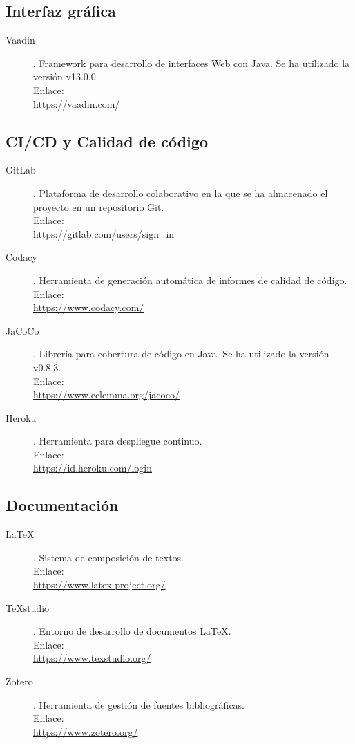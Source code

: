 \subsection{Interfaz gráfica}
\begin{description}
	\item[Vaadin]. Framework para desarrollo de interfaces Web con Java. Se ha utilizado la versión  v13.0.0\\ Enlace:\\ \url{https://vaadin.com/}
\end{description}
\subsection{CI/CD y Calidad de código}
\begin{description}
	\item[GitLab]. Plataforma de desarrollo colaborativo en la que se ha almacenado el proyecto en un repositorio Git.\\ Enlace:\\ \url{https://gitlab.com/users/sign_in}
	\item[Codacy]. Herramienta de generación automática de informes de calidad de código.\\ Enlace:\\ \url{https://www.codacy.com/}
	\item[JaCoCo]. Librería para cobertura de código en Java. Se ha utilizado la versión v0.8.3.\\ Enlace:\\ \url{https://www.eclemma.org/jacoco/}
	\item[Heroku]. Herramienta para despliegue continuo.\\ Enlace:\\ \url{https://id.heroku.com/login}
\end{description}
\subsection{Documentación}
\begin{description}
	\item[LaTeX]. Sistema de composición de textos.\\ Enlace:\\ \url{https://www.latex-project.org/}
	\item[TeXstudio]. Entorno de desarrollo de documentos LaTeX.\\ Enlace:\\ \url{https://www.texstudio.org/}
	\item[Zotero]. Herramienta de gestión de fuentes bibliográficas.\\ Enlace:\\ \url{https://www.zotero.org/}
\end{description}
